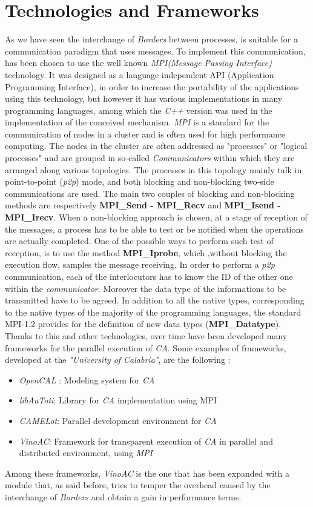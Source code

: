 \documentclass[12pt,a4paper,fleqn]{report}
\begin{document}
\section{Technologies and Frameworks }
As we have seen the interchange of \textit{Borders} between processes, is suitable for a communication paradigm that uses messages. To implement this communication, has been chosen to use the well known \textit{MPI(Message Passing Interface)} technology. It was designed as a language independent API (Application Programming Interface), in order to increase the portability of the applications using this technology, but however it has various implementations in many programming languages, among which the \textit{C++} version was used in the implementation of the conceived mechanism. \textit{MPI} is a standard for the communication of nodes in a cluster and is often used for high performance computing. The nodes in the cluster are often addressed as "processes" or "logical processes" and are grouped in so-called \textit{Communicators} within which they are arranged along various topologies. The processes in this topology mainly talk in point-to-point (\textit{p2p}) mode, and both blocking and non-blocking two-side communications are used. The main two couples of blocking and non-blocking methods are respectively \textbf{MPI\_Send - MPI\_Recv} and \textbf{MPI\_Isend - MPI\_Irecv}. When a non-blocking approach is chosen, at a stage of reception of the messages, a process has to be able to test or be notified when the operations are actually completed. One of the possible ways to perform such test of reception, is to use the method \textbf{MPI\_Iprobe}, which ,without blocking the execution flow, samples the message receiving. In order to perform a \textit{p2p} communication, each of the interlocutors has to know the ID of the other one within the \textit{communicator}. Moreover the data type of the informations to be transmitted have to be agreed. In addition to all the native types, corresponding to the native types of the majority of the programming languages, the standard MPI-1.2 provides for the definition of new data types (\textbf{MPI\_Datatype}). 
\\Thanks to this and other technologies, over time have been developed many frameworks for the parallel execution of \textit{CA}. Some examples of frameworks, developed at the \textit{"University of Calabria"}, are the following :
\begin{itemize}
\item
\textit{OpenCAL} : Modeling system for \textit{CA}
\item
\textit{libAuToti}: Library for \textit{CA} implementation using MPI
\item
\textit{CAMELot}: Parallel development environment for \textit{CA}
\item
\textit{VinoAC}: Framework for transparent execution of \textit{CA} in parallel and distributed environment, using \textit{MPI}
\end{itemize}
Among these frameworks, \textit{VinoAC} is the one that has been expanded with a module that, as said before, tries to temper the overhead caused by the interchange of \textit{Borders} and obtain a gain in performance terms.
\end{document}
